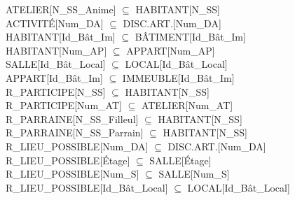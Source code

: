 \documentclass[a4paper,10.5pt]{report}
\begin{document}
	ATELIER[N\_SS\_Anime] $\subseteq$ HABITANT[N\_SS] \\

	ACTIVITÉ[Num\_DA] $\subseteq$ DISC.ART.[Num\_DA] \\

	HABITANT[Id\_Bât\_Im] $\subseteq$ BÂTIMENT[Id\_Bât\_Im] \\

	HABITANT[Num\_AP] $\subseteq$ APPART[Num\_AP] \\

	SALLE[Id\_Bât\_Local] $\subseteq$ LOCAL[Id\_Bât\_Local] \\

	APPART[Id\_Bât\_Im] $\subseteq$ IMMEUBLE[Id\_Bât\_Im] \\

	R\_PARTICIPE[N\_SS]  $\subseteq$ HABITANT[N\_SS] \\

	R\_PARTICIPE[Num\_AT] $\subseteq$ ATELIER[Num\_AT] \\

	R\_PARRAINE[N\_SS\_Filleul] $\subseteq$ HABITANT[N\_SS] \\

	R\_PARRAINE[N\_SS\_Parrain] $\subseteq$ HABITANT[N\_SS] \\

	R\_LIEU\_POSSIBLE[Num\_DA] $\subseteq$ DISC.ART.[Num\_DA] \\

	R\_LIEU\_POSSIBLE[Étage] $\subseteq$ SALLE[Étage] \\

	R\_LIEU\_POSSIBLE[Num\_S] $\subseteq$ SALLE[Num\_S] \\

	R\_LIEU\_POSSIBLE[Id\_Bât\_Local] $\subseteq$ LOCAL[Id\_Bât\_Local] \\
\end{document}
